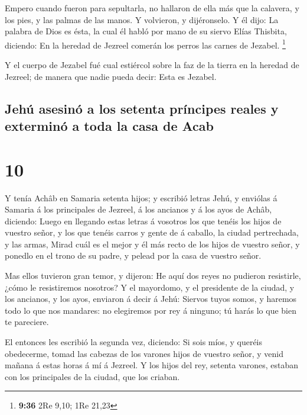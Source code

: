  Empero cuando fueron para sepultarla, no hallaron de
ella más que la calavera, y los pies, y las palmas de las manos.
 Y volvieron, y dijéronselo. Y él dijo: La palabra de
Dios es ésta, la cual él habló por mano de su siervo Elías Thisbita,
diciendo: En la heredad de Jezreel comerán los perros las carnes de
Jezabel. \footnote{\textbf{9:36} 2Re 9,10; 1Re 21,23}

 Y el cuerpo de Jezabel fué cual estiércol sobre la faz
de la tierra en la heredad de Jezreel; de manera que nadie pueda decir:
Esta es Jezabel.

\hypertarget{jehuxfa-asesinuxf3-a-los-setenta-pruxedncipes-reales-y-exterminuxf3-a-toda-la-casa-de-acab}{%
\subsection{Jehú asesinó a los setenta príncipes reales y exterminó a
toda la casa de
Acab}\label{jehuxfa-asesinuxf3-a-los-setenta-pruxedncipes-reales-y-exterminuxf3-a-toda-la-casa-de-acab}}

\hypertarget{section-9}{%
\section{10}\label{section-9}}

 Y tenía Achâb en Samaria setenta hijos; y escribió letras
Jehú, y enviólas á Samaria á los principales de Jezreel, á los ancianos
y á los ayos de Achâb, diciendo:  Luego en llegando estas
letras á vosotros los que tenéis los hijos de vuestro señor, y los que
tenéis carros y gente de á caballo, la ciudad pertrechada, y las armas,
 Mirad cuál es el mejor y él más recto de los hijos de
vuestro señor, y ponedlo en el trono de su padre, y pelead por la casa
de vuestro señor.

 Mas ellos tuvieron gran temor, y dijeron: He aquí dos
reyes no pudieron resistirle, ¿cómo le resistiremos nosotros?
 Y el mayordomo, y el presidente de la ciudad, y los
ancianos, y los ayos, enviaron á decir á Jehú: Siervos tuyos somos, y
haremos todo lo que nos mandares: no elegiremos por rey á ninguno; tú
harás lo que bien te pareciere.

 El entonces les escribió la segunda vez, diciendo: Si
sois míos, y queréis obedecerme, tomad las cabezas de los varones hijos
de vuestro señor, y venid mañana á estas horas á mí á Jezreel. Y los
hijos del rey, setenta varones, estaban con los principales de la
ciudad, que los criaban.

